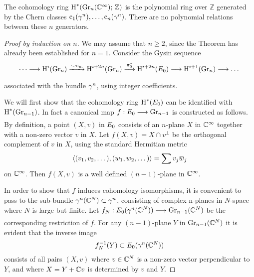 \documentclass[../main]{subfiles}
\begin{document}
\begin{theorem}
\label{thm:14.05} 
The cohomology ring $\operatorname{H}^\ast(\operatorname{Gr}_n(\mathbb C^\infty);\, \mathbb{Z})$ is the polynomial ring over $\mathbb{Z}$ generated by the Chern classes $\operatorname{c}_1(\gamma^n), \dots, \operatorname{c}_n(\gamma^n)$. There are no polynomial relations between these $n$ generators. 
\end{theorem}
\begin{proof}[Proof by induction on $n$]
We may assume that $n \geq 2$, since the Theorem has already been established for $n=1$. Consider the Gysin sequence
\[
\dots \longrightarrow \homology^i(\grassmannian_{n}) \varrightarrow{\smile \chernclass_n} \homology^{i+2n}(\grassmannian_{n}) \varrightarrow{\pi^\ast_0} \homology^{i+2n}(\total_0) \longrightarrow \homology^{i+1}(\grassmannian_{n}) \longrightarrow \dots
\]
associated with the bundle $\gamma^n$, using integer coefficients. 

We will first show that the cohomology ring $\operatorname{H}^{\ast}(E_0)$ can be identified with $\operatorname{H}^{\ast}(\operatorname{Gr}_{n-1})$. In fact a canonical map $f: \total_{0} \varrightarrow{} \grassmannian_{n-1}$ is constructed as follows. By definition, a point $(X, v)$ in $E_{0}$ consists of an $n$-plane $X$ in $\mathbb C^{\infty}$ together with a non-zero vector $v$ in $X$. Let $f(X, v)=X \cap v^\perp$ be the orthogonal complement of $v$ in $X$, using the standard Hermitian metric
\[
\ip{(v_{1}, v_{2}, \dots)}{(w_{1}, w_{2}, \dots)}=\sum v_{j} \xoverline{w}_{j}
\]
on $\mathbb C^{\infty}$. Then $f(X, v)$ is a well defined $(n-1)$-plane in $\mathbb C^{\infty}$.

In order to show that $f$ induces cohomology isomorphisms, it is convenient to pass to the sub-bundle $\gamma^{n}(\mathbb{C}^{N}) \subset \gamma^{n}$, consisting of complex n-planes in $N$-space where $N$ is large but finite. Let $f_{N}: \total_{0}(\tautological^{n}(\bC^{N})) \varrightarrow{} \grassmannian_{n-1}(\bC^{N})$ be the corresponding restriction of $f$. For any $(n-1)$-plane $Y$ in $\operatorname{Gr}_{n-1}(\mathbb C^N)$ it is evident that the inverse image
\[
f_{N}^{-1}(Y) \subset E_{0}(\gamma^{n}(\mathbb C^{N}))
\]
consists of all pairs $(X, v)$ where $v \in \mathbb C^N$ is a non-zero vector perpendicular to $Y$, and where $X=Y+\mathbb C v$ is determined by $v$ and $Y$. 


\end{proof}
\end{document}
